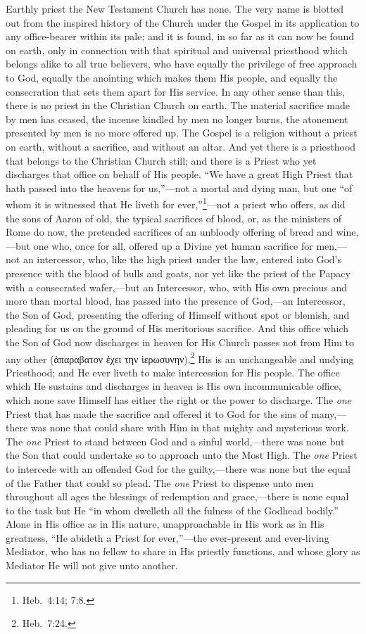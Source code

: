 \documentclass[
  english,
]{book}
\newcommand{\textgreek}[2][]{\foreignlanguage{greek}{#2}}
\begin{document}
Earthly priest the New Testament Church has none. The very name is blotted out from the inspired history of the Church under the Gospel in its application to any office-bearer within its pale; and it is found, in so far as it can now be found on earth, only in connection with that spiritual and universal priesthood which belongs alike to all true believers, who have equally the privilege of free approach to God, equally the anointing which makes them His people, and equally the consecration that sets them apart for His service. In any other sense than this, there is no priest in the Christian Church on earth. The material sacrifice made by men has ceased, the incense kindled by men no longer burns, the atonement presented by men is no more offered up. The Gospel is a religion without a priest on earth, without a sacrifice, and without an altar. And yet there is a priesthood that belongs to the Christian Church still; and there is a Priest who yet discharges that office on behalf of His people. ``We have a great High Priest that hath passed into the heavens for us,''---not a mortal and dying man, but one ``of whom it is witnessed that He liveth for ever,''\footnote{Heb.~4:14; 7:8.}---not a priest who offers, as did the sons of Aaron of old, the typical sacrifices of blood, or, as the ministers of Rome do now, the pretended sacrifices of an unbloody offering of bread and wine,---but one who, once for all, offered up a Divine yet human sacrifice for men,---not an intercessor, who, like the high priest under the law, entered into God's presence with the blood of bulls and goats, nor yet like the priest of the Papacy with a consecrated wafer,---but an Intercessor, who, with His own precious and more than mortal blood, has passed into the presence of God,---an Intercessor, the Son of God, presenting the offering of Himself without spot or blemish, and pleading for us on the ground of His meritorious sacrifice. And this office which the Son of God now discharges in heaven for His Church passes not from Him to any other (\textgreek{ἀπαραβατον ἐχει την ἱερωσυνην}).\footnote{Heb.~7:24.} His is an unchangeable and undying Priesthood; and He ever liveth to make intercession for His people. The office which He sustains and discharges in heaven is His own incommunicable office, which none save Himself has either the right or the power to discharge. The \emph{one} Priest that has made the sacrifice and offered it to God for the sins of many,---there was none that could share with Him in that mighty and mysterious work. The \emph{one} Priest to stand between God and a sinful world,---there was none but the Son that could undertake so to approach unto the Most High. The \emph{one} Priest to intercede with an offended God for the guilty,---there was none but the equal of the Father that could so plead. The \emph{one} Priest to dispense unto men throughout all ages the blessings of redemption and grace,---there is none equal to the task but He ``in whom dwelleth all the fulness of the Godhead bodily.'' Alone in His office as in His nature, unapproachable in His work as in His greatness, ``He abideth a Priest for ever,''---the ever-present and ever-living Mediator, who has no fellow to share in His priestly functions, and whose glory as Mediator He will not give unto another.
\end{document}
